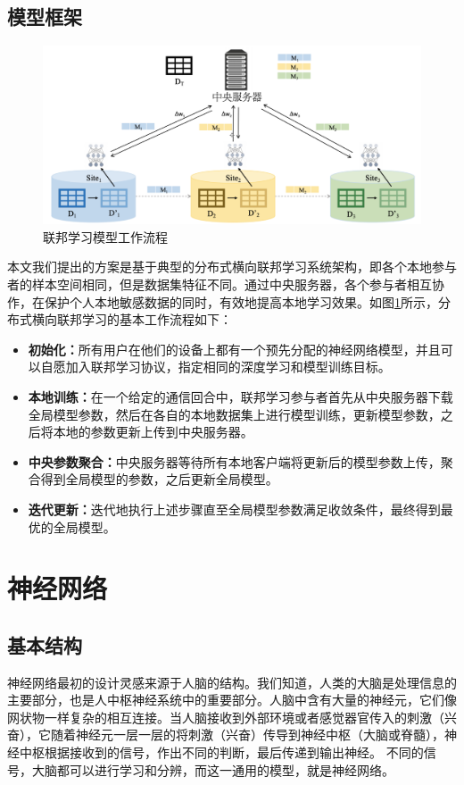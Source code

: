 \subsection{模型框架}

\begin{figure}[!hbt]
\centering
	\includegraphics[scale=0.45]{fig2/C2/联邦学习模型流程}%
	\caption{联邦学习模型工作流程}
	\label{fig:联邦学习模型工作流程}	
\end{figure}

本文我们提出的方案是基于典型的分布式横向联邦学习系统架构，即各个本地参与者的样本空间相同，但是数据集特征不同。通过中央服务器，各个参与者相互协作，在保护个人本地敏感数据的同时，有效地提高本地学习效果。如图\ref{fig:联邦学习模型工作流程}所示，分布式横向联邦学习的基本工作流程如下：
\begin{itemize}
\item \textbf{初始化：}所有用户在他们的设备上都有一个预先分配的神经网络模型，并且可以自愿加入联邦学习协议，指定相同的深度学习和模型训练目标。
\item  \textbf{本地训练：}在一个给定的通信回合中，联邦学习参与者首先从中央服务器下载全局模型参数，然后在各自的本地数据集上进行模型训练，更新模型参数，之后将本地的参数更新上传到中央服务器。
\item \textbf{中央参数聚合：}中央服务器等待所有本地客户端将更新后的模型参数上传，聚合得到全局模型的参数，之后更新全局模型。
\item \textbf{迭代更新：}迭代地执行上述步骤直至全局模型参数满足收敛条件，最终得到最优的全局模型。
\end{itemize}{}

\section{神经网络}
\subsection{基本结构}
神经网络最初的设计灵感来源于人脑的结构。我们知道，人类的大脑是处理信息的主要部分，也是人中枢神经系统中的重要部分。人脑中含有大量的神经元，它们像网状物一样复杂的相互连接。当人脑接收到外部环境或者感觉器官传入的刺激（兴奋），它随着神经元一层一层的将刺激（兴奋）传导到神经中枢（大脑或脊髓），神经中枢根据接收到的信号，作出不同的判断，最后传递到输出神经。
不同的信号，大脑都可以进行学习和分辨，而这一通用的模型，就是神经网络。

